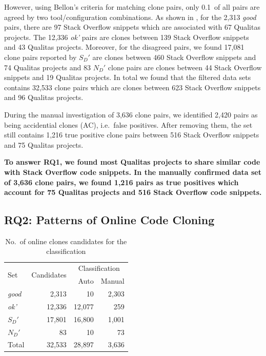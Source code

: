 \documentclass[sigconf,review, anonymous]{acmart}
\newcommand\FIXME[1]{\textbf{FIXME: #1}}
\begin{document}
However, using Bellon's criteria for matching clone pairs, only
0.1\textperthousand~of all pairs are agreed by two tool/configuration
combinations. As shown in , for the 2,313
\textit{good} pairs, there are 97 Stack Overflow snippets which are
associated with 67 Qualitas projects. The 12,336 \textit{ok'} pairs
are clones between 139 Stack Overflow snippets and 43 Qualitas
projects.  Moreover, for the disagreed pairs, we found 17,081 clone
pairs reported by $S_D'$ are clones between 460 Stack Overflow
snippets and 74 Qualitas projects and 83 $N_D'$ clone pairs are clones
between 44 Stack Overflow snippets and 19 Qualitas projects. In total
we found that the filtered data sets contains 32,533 clone pairs which
are clones between 623 Stack Overflow snippets and 96 Qualitas
projects. 

During the manual investigation of 3,636 clone pairs, we identified 2,420 pairs
as being accidential clones (AC), i.e.~false positives. After removing
them, the set still contains 1,216 true positive clone pairs between 516 Stack
Overflow snippets and 75 Qualitas projects.

\textbf{To answer RQ1, we found most Qualitas projects to share
  similar code with Stack Overflow code snippets. In the manually confirmed 
  data set of 3,636 clone pairs, we found 1,216 pairs as true positives which 
  account for 75 Qualitas projects and
  516 Stack Overflow code snippets.}


\subsection{RQ2: Patterns of Online Code Cloning}

\begin{table}
	\centering
	\caption{No.~of online clones candidates for the classification}
	\label{tab:online_clone_classification_results}
	\begin{tabular}{l|r|r|r}
		\hline
		\multirow{2}{*}{Set} & \multirow{2}{*}{Candidates} & \multicolumn{2}{c}{Classification} \\ \cline{3-4}
		& & Auto & Manual \\
		\hline 
		\multirow{1}{*}{\textit{good}} & 2,313 & 10 & 2,303 \\
		\multirow{1}{*}{\textit{ok'}} & 12,336 & 12,077 & 259 \\
		\multirow{1}{*}{$S_D'$} & 17,801 & 16,800 & 1,001 \\
		\multirow{1}{*}{$N_D'$} & 83 & 10 & 73 \\ 
		\hline
		Total  & 32,533 & 28,897 & 3,636 \\ 
		\hline
	\end{tabular} %
\end{table}
\end{document}
